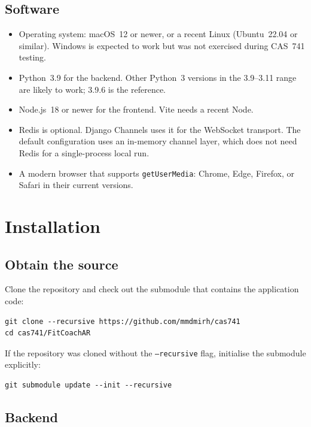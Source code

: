 \documentclass{article}
\begin{document}
\subsection{Software}

\begin{itemize}
  \item Operating system: macOS~12 or newer, or a recent Linux
    (Ubuntu~22.04 or similar). Windows is expected to work but was
    not exercised during CAS~741 testing.
  \item Python~3.9 for the backend. Other Python~3 versions in the
    3.9--3.11 range are likely to work; 3.9.6 is the reference.
  \item Node.js~18 or newer for the frontend. Vite needs a recent
    Node.
  \item Redis is optional. Django Channels uses it for the WebSocket
    transport. The default configuration uses an in-memory channel
    layer, which does not need Redis for a single-process local run.
  \item A modern browser that supports \texttt{getUserMedia}: Chrome,
    Edge, Firefox, or Safari in their current versions.
\end{itemize}

\section{Installation}

\subsection{Obtain the source}

Clone the repository and check out the submodule that contains the
application code:

\begin{verbatim}
git clone --recursive https://github.com/mmdmirh/cas741
cd cas741/FitCoachAR
\end{verbatim}

If the repository was cloned without the \texttt{--recursive} flag,
initialise the submodule explicitly:

\begin{verbatim}
git submodule update --init --recursive
\end{verbatim}

\subsection{Backend}
\end{document}
